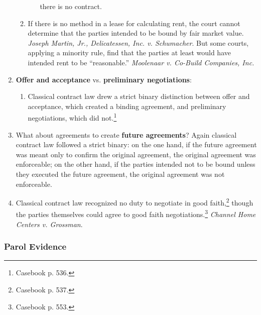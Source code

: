 \begin{enumerate}
\begin{enumerate}
\begin{enumerate}
            there is no contract.
        \end{enumerate}
        \item If there is no method in a lease for calculating rent, the court 
        cannot determine that the parties intended to be bound by fair market 
        value. \emph{Joseph Martin, Jr., Delicatessen, Inc. v. Schumacher}. 
        But some courts, applying a minority rule, find that the parties at 
        least would have intended rent to be ``reasonable.'' \emph{Moolenaar 
        v. Co-Build Companies, Inc.}
    \end{enumerate}
    \item \textbf{Offer and acceptance} vs. \textbf{preliminary 
    negotiations}:
    \begin{enumerate}
        \item Classical contract law drew a strict binary distinction between 
        offer and acceptance, which created a binding agreement, and 
        preliminary negotiations, which did not.\footnote{Casebook p. 536.}
    \end{enumerate}
    \item What about agreements to create \textbf{future agreements}? Again 
    classical contract law followed a strict binary: on the one hand, if the 
    future agreement was meant only to confirm the original agreement, the 
    original agreement was enforceable; on the other hand, if the parties 
    intended not to be bound unless they executed the future agreement, the 
    original agreement was not enforceable.
    \item Classical contract law recognized no duty to negotiate in good 
    faith,\footnote{Casebook p. 537.} though the parties themselves could 
    agree to good faith negotiations.\footnote{Casebook p. 553.} \emph{Channel 
    Home Centers v. Grossman}.
\end{enumerate}

\subsubsection{Parol Evidence}

